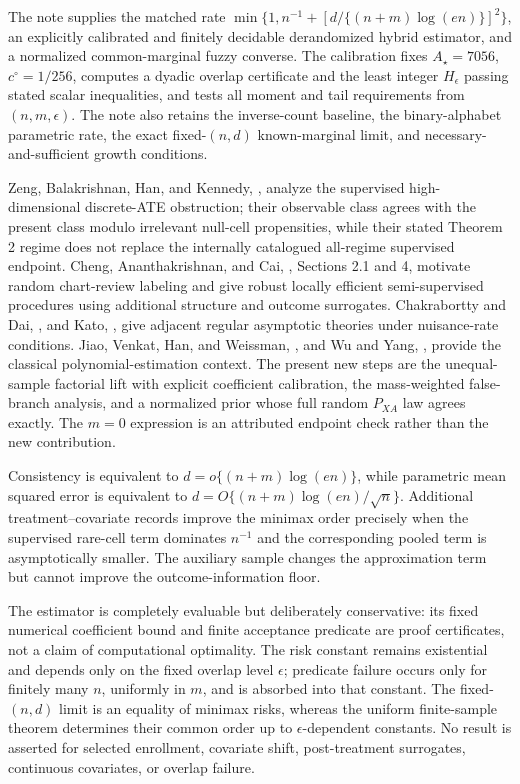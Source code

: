 The note supplies the matched rate \(\min\{1,n^{-1}+[d/\{(n+m)\log(en)\}]^2\}\), an explicitly calibrated and finitely decidable derandomized hybrid estimator, and a normalized common-marginal fuzzy converse.  The calibration fixes \(A_\star=7056\), \(c^\circ=1/256\), computes a dyadic overlap certificate and the least integer \(H_\epsilon\) passing stated scalar inequalities, and tests all moment and tail requirements from \((n,m,\epsilon)\).  The note also retains the inverse-count baseline, the binary-alphabet parametric rate, the exact fixed-\((n,d)\) known-marginal limit, and necessary-and-sufficient growth conditions.

Zeng, Balakrishnan, Han, and Kennedy, \cite{ZengBalakrishnanHanKennedy2024}, analyze the supervised high-dimensional discrete-ATE obstruction; their observable class agrees with the present class modulo irrelevant null-cell propensities, while their stated Theorem 2 regime does not replace the internally catalogued all-regime supervised endpoint.  Cheng, Ananthakrishnan, and Cai, \cite{ChengAnanthakrishnanCai2021}, Sections 2.1 and 4, motivate random chart-review labeling and give robust locally efficient semi-supervised procedures using additional structure and outcome surrogates.  Chakrabortty and Dai, \cite{ChakraborttyDai2024}, and Kato, \cite{Kato2025}, give adjacent regular asymptotic theories under nuisance-rate conditions.  Jiao, Venkat, Han, and Weissman, \cite{JiaoVenkatHanWeissman2015}, and Wu and Yang, \cite{WuYang2016}, provide the classical polynomial-estimation context.  The present new steps are the unequal-sample factorial lift with explicit coefficient calibration, the mass-weighted false-branch analysis, and a normalized prior whose full random \(P_{XA}\) law agrees exactly.  The \(m=0\) expression is an attributed endpoint check rather than the new contribution.

Consistency is equivalent to \(d=o\{(n+m)\log(en)\}\), while parametric mean squared error is equivalent to \(d=O\{(n+m)\log(en)/\sqrt n\}\).  Additional treatment--covariate records improve the minimax order precisely when the supervised rare-cell term dominates \(n^{-1}\) and the corresponding pooled term is asymptotically smaller.  The auxiliary sample changes the approximation term but cannot improve the outcome-information floor.

The estimator is completely evaluable but deliberately conservative: its fixed numerical coefficient bound and finite acceptance predicate are proof certificates, not a claim of computational optimality.  The risk constant remains existential and depends only on the fixed overlap level \(\epsilon\); predicate failure occurs only for finitely many \(n\), uniformly in \(m\), and is absorbed into that constant.  The fixed-\((n,d)\) limit is an equality of minimax risks, whereas the uniform finite-sample theorem determines their common order up to \(\epsilon\)-dependent constants.  No result is asserted for selected enrollment, covariate shift, post-treatment surrogates, continuous covariates, or overlap failure.

